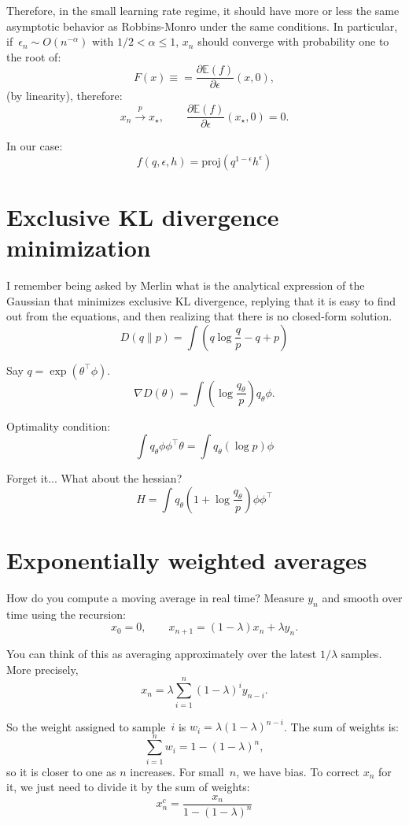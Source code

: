 \documentclass{article}
\begin{document}
Therefore, in the small learning rate regime, it should have more or less the same asymptotic behavior as Robbins-Monro under the same conditions. In particular, if~$\epsilon_n\sim O(n^{-\alpha})$ with $1/2<\alpha\leq 1$, $x_n$ should converge with probability one to the root of:
$$F(x)
\equiv 
= \frac{\partial \mathbb{E}(f)}{\partial \epsilon} (x,0),
$$
(by linearity), therefore:
$$
x_n \stackrel{p}{\to} x_\star,
\qquad 
\frac{\partial \mathbb{E}(f)}{\partial \epsilon} (x_\star,0)=0.
$$

In our case:
$$
f(q,\epsilon,h) = \text{proj}(q^{1-\epsilon}h^\epsilon)
$$



\section{Exclusive KL divergence minimization}

I remember being asked by Merlin what is the analytical expression of the Gaussian that minimizes exclusive KL divergence, replying that it is easy to find out from the equations, and then realizing that there is no closed-form solution.
$$
D(q\|p) = \int (q \log\frac{q}{p} - q + p)
$$

Say $q=\exp(\theta^\top \phi)$. 
$$
\nabla D(\theta) = 
\int (\log\frac{q_\theta}{p}) q_\theta\phi.
$$

Optimality condition:
$$
\int q_\theta \phi \phi^\top \theta
= \int q_\theta (\log p) \phi
$$

Forget it... What about the hessian?
$$
H = \int q_\theta(1 + \log\frac{q_\theta}{p}) \phi\phi^\top 
$$


\section{Exponentially weighted averages}

How do you compute a moving average in real time? Measure $y_n$ and smooth over time using the recursion:
$$
x_0 = 0,
\qquad
x_{n+1} = (1-\lambda) x_n + \lambda y_n.
$$

You can think of this as averaging approximately over the latest $1/\lambda$ samples. More precisely,
$$
x_n = \lambda \sum_{i=1}^n (1-\lambda)^i y_{n-i}.
$$

So the weight assigned to sample~$i$ is $w_i=\lambda (1-\lambda)^{n-i}$. The sum of weights is:
$$
\sum_{i=1}^n w_i = 1 - (1-\lambda)^n,
$$
so it is closer to one as $n$ increases. For small~$n$, we have bias. To correct $x_n$ for it, we just need to divide it by the sum of weights:
$$
x_n^c = \frac{x_n}{1 - (1-\lambda)^n}
$$
\end{document}
